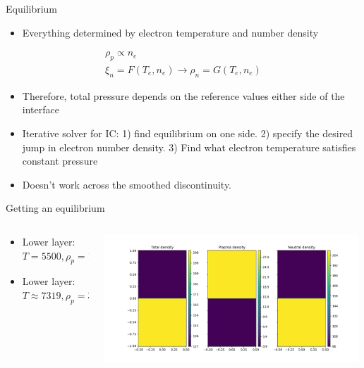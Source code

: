 \documentclass[10pt,aspectratio=169,usenames,dvipsnames]{beamer}
\begin{document}
\begin{frame}{Equilibrium}
\begin{itemize}
    \item Everything determined by electron temperature and number density
\end{itemize}
\begin{gather}
    \rho_p \propto n_e \\
    \xi_n=F(T_e,n_e) \xrightarrow{} \rho_n=G(T_e,n_e)
\end{gather}
\begin{itemize}
    \item Therefore, total pressure depends on the reference values either side of the interface
    \item Iterative solver for IC: 1) find equilibrium on one side. 2) specify the desired jump in electron number density. 3) Find what electron temperature satisfies constant pressure
    \item Doesn't work across the smoothed discontinuity.
\end{itemize}
\end{frame}

\begin{frame}{Getting an equilibrium}
\begin{columns}
\begin{column}{0.3\textwidth}
    \begin{itemize}
        \item Lower layer: $T=5500, \rho_p=1,\rho_n \approx 208, \xi_n\approx 0.995$ 
        \item Lower layer: $T\approx 7319, \rho_p=30,\rho_n \approx 97, \xi_n\approx 0.764$ 
    \end{itemize}
\end{column}
\begin{column}{0.7\textwidth}
\includegraphics[width=0.99\textwidth]{2023Mixing/Figures/KHInlev_initialconditions.png}
\end{column}
\end{columns}
\end{frame}
\end{document}
